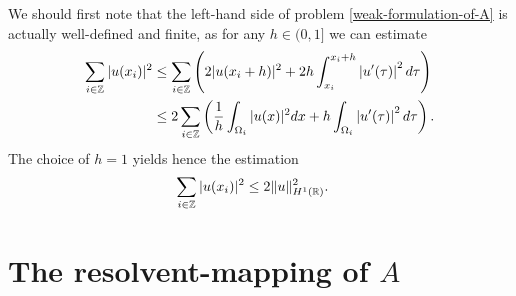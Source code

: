 We should first note that the left-hand side of problem \eqref{weak-formulation-of-A} is actually well-defined and finite, as for any $h \in (0, 1]$ we can estimate
\begin{align}
	\sum_{i \in \mathbb{Z}} |u(x_{i})|^{2} & \leq \sum_{i \in \mathbb{Z}} \left( 2 |u( x_{i} + h )|^{2} +  2 h \int_{x_{i}}^{x_{i} + h} \left| u'(\tau) \right|^{2} d\tau \right) \notag \\
		 & \leq 2 \sum_{i \in \mathbb{Z}} \left( \frac{1}{h} \int_{\Omega_{i}} |u( x )|^{2} dx + h \int_{\Omega_{i}} \left| u'(\tau) \right|^{2} d\tau \right). \label{preestimation-for-potential}
\end{align}
The choice of $h = 1$ yields hence the estimation
\begin{align} 
		\sum_{i \in \mathbb{Z}} |u(x_{i})|^{2} & \leq 2 \| u \|^{2}_{H^{1}(\mathbb{R})}. \label{estimation-for-potential}
\end{align}

\section{The resolvent-mapping of $A$}

